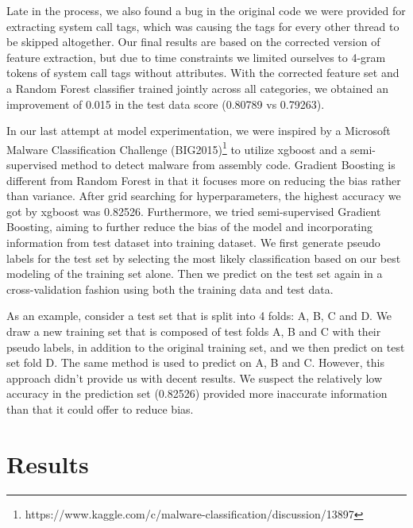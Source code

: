 \documentclass[11pt]{article}
\begin{document}
\begin{enumerate}
Late in the process, we also found a bug in the original code we were provided for extracting system call tags, which was causing the tags for every other thread to be skipped altogether. Our final results are based on the corrected version of feature extraction, but due to time constraints we limited ourselves to 4-gram tokens of system call tags without attributes. With the corrected feature set and a Random Forest classifier trained jointly across all categories, we obtained an improvement of 0.015 in the test data score (0.80789 vs 0.79263).

In our last attempt at model experimentation, we were inspired by a Microsoft Malware Classification Challenge (BIG2015)\footnote{https://www.kaggle.com/c/malware-classification/discussion/13897} to utilize xgboost and a semi-supervised method to detect malware from assembly code. Gradient Boosting is different from Random Forest in that it focuses more on reducing the bias rather than variance. After grid searching for hyperparameters, the highest accuracy we got by xgboost was 0.82526. Furthermore, we tried semi-supervised Gradient Boosting, aiming to further reduce the bias of the model and incorporating information from test dataset into training dataset. We first generate pseudo labels for the test set by selecting the most likely classification based on our best modeling of the training set alone. Then we predict on the test set again in a cross-validation fashion using both the training data and test data.

As an example, consider a test set that is split into 4 folds: A, B, C and D. We draw a new training set that is composed of test folds A, B and C with their pseudo labels, in addition to the original training set, and we then predict on test set fold D. The same method is used to predict on A, B and C. However, this approach didn't provide us with decent results. We suspect the relatively low accuracy in the prediction set (0.82526) provided more inaccurate information than that it could offer to reduce bias.
 
\end{enumerate}

\section{Results}
\end{document}
